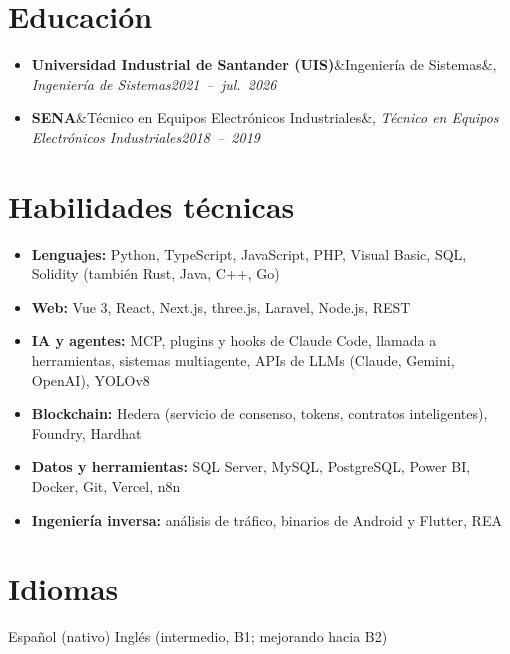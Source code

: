 \documentclass[a4paper,10pt]{article}
\newcommand{\entry}[3]{\textbf{#1}\ifx&#2&\else, \textit{#2}\fi \hfill \mbox{\textit{#3}}}
\begin{document}
\section*{Educación}
\begin{itemize}
    \item \entry{Universidad Industrial de Santander (UIS)}{Ingeniería de Sistemas}{2021 -- jul.\ 2026}
    \item \entry{SENA}{Técnico en Equipos Electrónicos Industriales}{2018 -- 2019}
\end{itemize}

\section*{Habilidades técnicas}
\begin{itemize}
    \item \textbf{Lenguajes:} Python, TypeScript, JavaScript, PHP, Visual Basic, SQL, Solidity
        (también Rust, Java, C++, Go)
    \item \textbf{Web:} Vue 3, React, Next.js, three.js, Laravel, Node.js, REST
    \item \textbf{IA y agentes:} MCP, plugins y hooks de Claude Code, llamada a herramientas,
        sistemas multiagente, APIs de LLMs (Claude, Gemini, OpenAI), YOLOv8
    \item \textbf{Blockchain:} Hedera (servicio de consenso, tokens, contratos inteligentes), Foundry, Hardhat
    \item \textbf{Datos y herramientas:} SQL Server, MySQL, PostgreSQL, Power BI, Docker, Git, Vercel, n8n
    \item \textbf{Ingeniería inversa:} análisis de tráfico, binarios de Android y Flutter, REA
\end{itemize}

\section*{Idiomas}
Español (nativo) \textperiodcentered{} Inglés (intermedio, B1; mejorando hacia B2)
\end{document}
